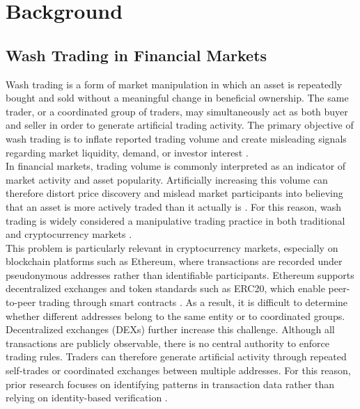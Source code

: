\documentclass[language=english,thesis=bachelor,nosecondtitle,faculty=cb,onesided,13pt]{hsmw-thesis}
\begin{document}
\chapter{Background}
	\section{Wash Trading in Financial Markets}
Wash trading is a form of market manipulation in which an asset is repeatedly bought and sold without a meaningful change in beneficial ownership. The same trader, or a coordinated group of traders, may simultaneously act as both buyer and seller in order to generate artificial trading activity. The primary objective of wash trading is to inflate reported trading volume and create misleading signals regarding market liquidity, demand, or investor interest \cite{imisiker2018wash, cao2016detecting}.\\
In financial markets, trading volume is commonly interpreted as an indicator of market activity and asset popularity. Artificially increasing this volume can therefore distort price discovery and mislead market participants into believing that an asset is more actively traded than it actually is \cite{cong2023crypto, pennec2021wash}. For this reason, wash trading is widely considered a manipulative trading practice in both traditional and cryptocurrency markets \cite{victor2021detecting, cui2023chain}.\\
This problem is particularly relevant in cryptocurrency markets, especially on blockchain platforms such as Ethereum, where transactions are recorded under pseudonymous addresses rather than identifiable participants. Ethereum supports decentralized exchanges and token standards such as ERC20, which enable peer-to-peer trading through smart contracts \cite{buterin2013next, fenu2018ico}. As a result, it is difficult to determine whether different addresses belong to the same entity or to coordinated groups.\\
Decentralized exchanges (DEXs) further increase this challenge. Although all transactions are publicly observable, there is no central authority to enforce trading rules. Traders can therefore generate artificial activity through repeated self-trades or coordinated exchanges between multiple addresses. For this reason, prior research focuses on identifying patterns in transaction data rather than relying on identity-based verification \cite{victor2021detecting, cui2023chain}.\\
\end{document}
